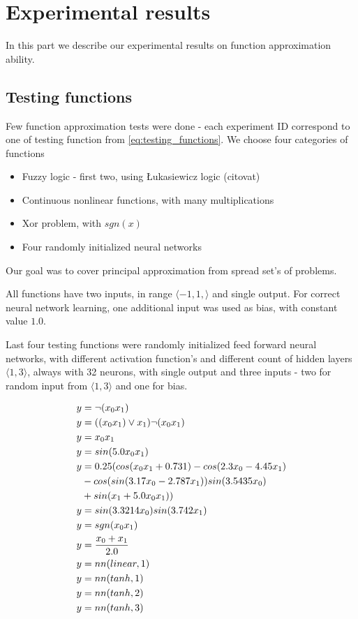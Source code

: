 \documentclass[times]{cpeauth}
\begin{document}
\section{Experimental results}

In this part we describe our experimental results on function approximation ability.

\subsection{Testing functions}
Few function approximation tests were done - each experiment ID correspond to one
of testing function from \ref{eq:testing_functions}. We choose four categories of functions

\begin{itemize}
  \item Fuzzy logic - first two, using Łukasiewicz logic (citovat)
  \item Continuous nonlinear functions, with many multiplications
  \item Xor problem, with $sgn(x)$
  \item Four randomly initialized neural networks
\end{itemize}

Our goal was to cover principal approximation from spread set's of problems.

All functions have two inputs, in range $\langle -1, 1, \rangle$ and single output.
For correct neural network learning, one additional input was used as bias, with constant value $1.0$.

Last four testing functions were randomly initialized feed forward neural networks,
with different activation function's and different count of hidden layers $\langle 1, 3\rangle$, always with 32
neurons, with single output and three inputs - two for random input from $\langle 1, 3\rangle$ and one for bias.

\begin{align}
\label{eq:testing_functions}
  y &= \neg(x_0 \relax x_1) \nonumber \\
  y &=  ((x_0 \relax x_1) \lor x_1) \relax \neg(x_0 \relax x_1) \nonumber \\
  y &= x_0x_1 \nonumber \\
  y &= sin(5.0x_0 x_1) \nonumber \\
  y &=  0.25(cos(x_0x_1 + 0.731) - cos(2.3x_0 - 4.45x_1)  \nonumber \\
        &-cos(sin(3.17x_0 - 2.787x_1))sin(3.5435x_0)  \nonumber \\
        &+sin(x_1 + 5.0x_0x_1)) \nonumber \\
  y &= sin(3.3214x_0)sin(3.742x_1) \nonumber \\
  y &= sgn(x_0x_1) \nonumber \\
  y &= \frac{x_0 + x_1}{2.0} \nonumber \\
  y &= nn(linear, 1) \nonumber \\
  y &= nn(tanh, 1) \nonumber \\
  y &= nn(tanh, 2) \nonumber \\
  y &= nn(tanh, 3) \nonumber \\
\end{align}
\end{document}
